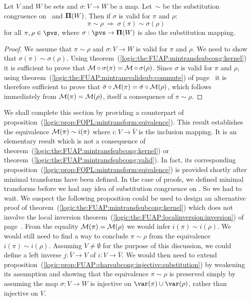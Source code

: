 \begin{theorem}\label{logic:the:FUAP:mintransfsubcong:valid}
Let $V$ and $W$ be sets and $\sigma:V\to W$ be a map. Let~$\sim$ be
the substitution congruence on \pvs\ and ${\bf\Pi}(W)$. Then if
$\sigma$ is valid for $\pi$ and $\rho$:
    \[
    \pi\sim\rho\ \Rightarrow\ \sigma(\pi)\sim\sigma(\rho)
    \]
for all $\pi,\rho\in\pvs$, where $\sigma:\pvs\to{\bf\Pi}(W)$ is also
the substitution mapping.
\end{theorem}
\begin{proof}
We assume that $\pi\sim\rho$ and $\sigma:V\to W$ is valid for $\pi$
and $\rho$. We need to show that $\sigma(\pi)\sim\sigma(\rho)$.
Using theorem~(\ref{logic:the:FUAP:mintransfsubcong:kernel}) it is
sufficient to prove that ${\cal M}\circ\sigma(\pi)={\cal
M}\circ\sigma(\rho)$. Since $\sigma$ is valid for $\pi$ and $\rho$,
using theorem~(\ref{logic:the:FUAP:mintransvalidsub:commute}) of
page~\pageref{logic:the:FUAP:mintransvalidsub:commute} it is
therefore sufficient to prove that $\bar{\sigma}\circ{\cal
M}(\pi)=\bar{\sigma}\circ{\cal M}(\rho)$, which follows immediately
from ${\cal M}(\pi)={\cal M}(\rho)$, itself a consequence of
$\pi\sim\rho$.
\end{proof}

We shall complete this section by providing a counterpart of
proposition~(\ref{logic:prop:FOPL:mintransform:eqivalence}). This
result establishes the equivalence ${\cal M}(\pi)\sim i(\pi)$ where
$i:V\to\bar{V}$ is the inclusion mapping. It is an elementary result
which is not a consequence of
theorem~(\ref{logic:the:FUAP:mintransfsubcong:kernel}) or
theorem~(\ref{logic:the:FUAP:mintransfsubcong:valid}). In fact, its
corresponding
proposition~(\ref{logic:prop:FOPL:mintransform:eqivalence}) is
provided shortly after minimal transforms have been defined. In the
case of proofs, we defined minimal transforms before we had any idea
of substitution congruence on \pvs. So we had to wait. We suspect
the following proposition could be used to design an alternative
proof of theorem~(\ref{logic:the:FUAP:mintransfsubcong:kernel})
which does not involve the local inversion
theorem~(\ref{logic:the:FUAP:localinversion:inversion}) of
page~\pageref{logic:the:FUAP:localinversion:inversion}. From the
equality ${\cal M}(\pi)={\cal M}(\rho)$ we would infer $i(\pi)\sim
i(\rho)$. We would still need to find a way to conclude
$\pi\sim\rho$ from the equivalence $i(\pi)\sim i(\rho)$. Assuming
$V\neq\emptyset$ for the purpose of this discussion, we could define
a left inverse $j:\bar{V}\to V$ of $i:V\to\bar{V}$. We would then
need to extend
proposition~(\ref{logic:prop:FUAP:charsubcong:injective:substitution})
by weakening its assumption and showing that the equivalence
$\pi\sim\rho$ is preserved simply by assuming the map $\sigma:V\to
W$ is injective on $\var(\pi)\cup\var(\rho)$, rather than injective
on $V$.

